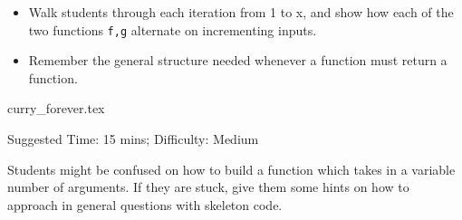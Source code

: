 \documentclass{exam}
\begin{document}
\begin{questions}
\begin{questionmeta}
\begin{itemize}
            \item Walk students through each iteration from 1 to x, and show how each of the two functions \verb|f,g| alternate on incrementing inputs.
            \item Remember the general structure needed whenever a function must return a function.
        \end{itemize}
    \end{questionmeta}
    {curry_forever.tex}
    \begin{questionmeta}
        Suggested Time: 15 mins; Difficulty: Medium
        \item Students might be confused on how to build a function which takes in a variable number of arguments. If they are stuck, give them some hints on how to approach in general questions with skeleton code.
    \end{questionmeta}
\end{questions}
\end{document}

